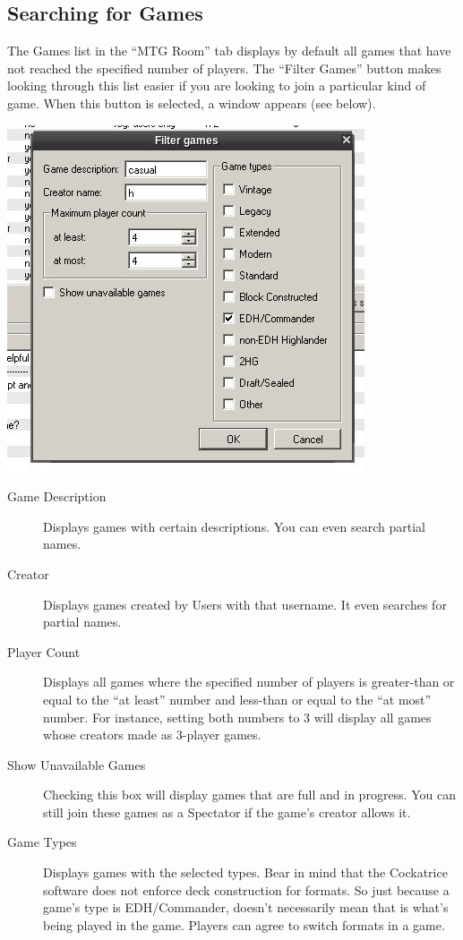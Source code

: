\documentclass[a4paper]{scrbook}
\begin{document}
\subsection{Searching for Games}
The Games list in the “MTG Room” tab displays by default all games that have not reached the specified number of players. The “Filter Games” button makes looking through this list easier if you are looking to join a particular kind of game. When this button is selected, a window appears (see below).
\begin{center}
\includegraphics[scale=0.5]{pics/fetchd30e}
\end{center}
\begin{description}
 \item[Game Description] Displays games with certain descriptions. You can even search partial names.
 \item[Creator] Displays games created by Users with that username. It even searches for partial names.
 \item[Player Count] Displays all games where the specified number of players is greater-than or equal to the “at least” number and less-than or equal to the “at most” number. For instance, setting both numbers to 3 will display all games whose creators made as 3-player games.
 \item[Show Unavailable Games] Checking this box will display games that are full and in progress. You can still join these games as a Spectator if the game's creator allows it.
 \item[Game Types] Displays games with the selected types. Bear in mind that the Cockatrice software does not enforce deck construction for formats. So just because a game's type is EDH/Commander, doesn't necessarily mean that is what's being played in the game. Players can agree to switch formats in a game.
\end{description}
\end{document}
